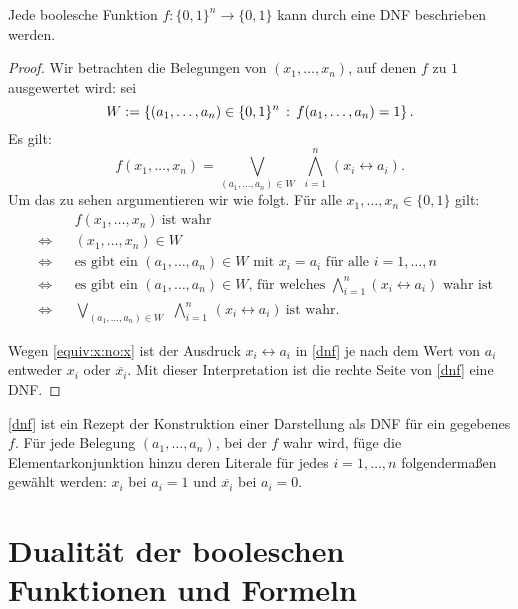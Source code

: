 \begin{thm}
	Jede boolesche Funktion $ f: \{0,1\}^n \to \{0,1\}$ kann durch eine DNF beschrieben werden. 
\end{thm} 
\begin{proof}
	Wir betrachten die Belegungen von $(x_1,\ldots,x_n)$, auf denen $f$ zu $1$ ausgewertet wird: 
	sei 
	\[
	W := \left\{  (a_1,\ldots,a_n) \in \{0,1\}^n \,:\, f(a_1,\ldots,a_n) = 1 \right\}. 
	\]
	Es gilt:
	\begin{equation}
		\label{dnf}
		f(x_1,\ldots,x_n) = \bigvee_{ (a_1,\ldots,a_n) \in W} \ \, \bigwedge_{i=1}^n \, (x_i \leftrightarrow a_i). 
	\end{equation} 
	Um das zu sehen argumentieren wir wie folgt. Für alle $x_1,\ldots,x_n \in \{0,1\}$ gilt:
	\begin{align*}
		& & 	& f(x_1,\ldots,x_n) \ \text{ist wahr}  
	\\	& \Leftrightarrow &  & (x_1,\ldots,x_n) \in W
	\\	& \Leftrightarrow & & \text{es gibt ein $(a_1,\ldots,a_n) \in W$ mit $x_i=a_i$ für alle $i=1,\ldots,n$} 
	\\  & \Leftrightarrow & & \text{es gibt ein $(a_1,\ldots,a_n) \in W$, für welches $\bigwedge_{i=1}^n (x_i \leftrightarrow a_i)$ wahr ist}
	\\  & \Leftrightarrow & & \bigvee_{ (a_1,\ldots,a_n) \in W} \ \, \bigwedge_{i=1}^n \, (x_i \leftrightarrow a_i) \ \text{ist wahr}. 
	\end{align*} 

	Wegen \eqref{equiv:x:no:x} ist der Ausdruck $x_i \leftrightarrow a_i$ in \eqref{dnf} je nach dem Wert von $a_i$ entweder $x_i$ oder $\overline{x_i}$. Mit dieser Interpretation ist die rechte Seite von \eqref{dnf} eine DNF.
\end{proof} 

\begin{bem} \label{dnf:rezept}
	\eqref{dnf} ist ein Rezept der Konstruktion einer Darstellung als DNF für ein gegebenes $f$. Für jede Belegung $(a_1,\ldots,a_n)$, bei der $f$ wahr wird, füge die Elementarkonjunktion hinzu deren Literale für jedes $i=1,\ldots,n$ folgendermaßen  gewählt werden: $x_i$ bei $a_i=1$ und $\overline{x_i}$ bei $a_i=0$. 
\end{bem} 


\section{Dualität der booleschen Funktionen und Formeln} 

